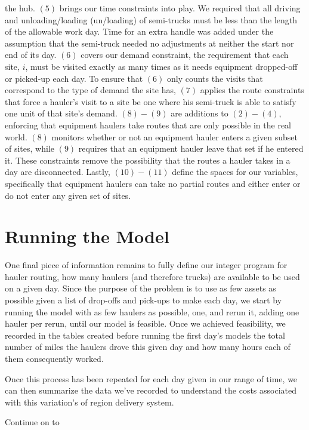 \documentclass[letterpaper,10pt,english]{sphinxmanual}
\begin{document}
the hub. \((5)\) brings our time constraints into play. We required that
all driving and unloading/loading (un/loading) of semi-trucks must be less
than the length of the allowable work day. Time for an extra handle was added
under the assumption that the semi-truck needed no adjustments at neither the
start nor end of its day. \((6)\) covers our demand
constraint, the requirement that each site, \(i\), must be visited exactly
as many times as it needs equipment dropped-off or picked-up each
day. To ensure that \((6)\) only counts the visits that correspond to the
type of demand the site has, \((7)\) applies the route constraints that
force a hauler's visit to a site be one where his semi-truck is able to
satisfy one unit of that site's demand. \((8)-(9)\) are additions to
\((2)-(4)\), enforcing that equipment haulers take routes that are only
possible in the real world. \((8)\) monitors whether or not an equipment
hauler enters a given subset of sites, while \((9)\) requires that an
equipment hauler leave that set if he entered it. These constraints remove
the possibility that the routes a hauler takes in a day are disconnected.
Lastly, \((10)-(11)\) define the spaces for our variables, specifically
that equipment haulers can take no partial routes and either enter or do not
enter any given set of sites.


\section{Running the Model}
\label{\detokenize{daily-routing:running-the-model}}
One final piece of information remains to fully define our integer program
for hauler routing, how many haulers (and therefore trucks) are available
to be used on a given day. Since the purpose of the problem is to use as few
assets as possible given a list of drop-offs and pick-ups to make each day,
we start by running the model with as few haulers as possible, one, and rerun
it, adding one hauler per rerun, until our model is feasible. Once we achieved
feasibility, we recorded in the tables created before running the first day's
models the total number of miles the haulers drove this given day and how
many hours each of them consequently worked.

Once this process has been repeated for each day given in our range of time,
we can then summarize the data we've recorded to understand the costs
associated with this variation's of region delivery system.

Continue on to {\hyperref[\detokenize{reporting:reporting}]{}}
\end{document}
